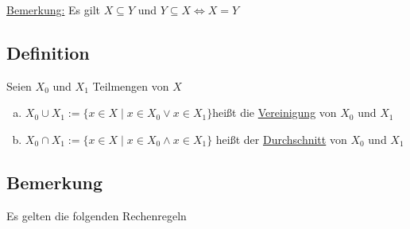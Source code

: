 \underline{Bemerkung:} Es gilt \(X \subseteq Y\) und \( Y \subseteq X \Leftrightarrow X=Y \)


\subsection{Definition}
Seien \(X_0\) und \(X_1\) Teilmengen von \(X\)
\begin{enumerate}[a)]
\item 
\(X_0 \cup X_1 := \{ x \in X \mid x \in X_0  \vee x \in X_1\} \)heißt die \underline{Vereinigung} von \(X_0\) und \(X_1\)

\item 
\(X_0 \cap X_1 := \{ x \in X \mid x \in X_0  \wedge x \in X_1\} \) heißt der \underline{Durchschnitt} von \(X_0\) und \(X_1\)
\end{enumerate}

\subsection{Bemerkung}
Es gelten die folgenden Rechenregeln


